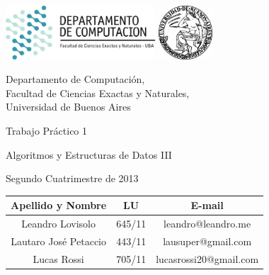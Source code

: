 \documentclass[a4paper, 10pt, twoside]{article}
\begin{document}


\thispagestyle{caratula}

\begin{center}

\includegraphics[height=2cm]{DC.png} 
\hfill
\includegraphics[height=2cm]{UBA.jpg} 

\vspace{2cm}

Departamento de Computación,\\
Facultad de Ciencias Exactas y Naturales,\\
Universidad de Buenos Aires

\vspace{4cm}

\begin{Huge}
Trabajo Práctico 1
\end{Huge}

\vspace{0.5cm}

\begin{Large}
Algoritmos y Estructuras de Datos III
\end{Large}

\vspace{1cm}

Segundo Cuatrimestre de 2013

\vspace{4cm}

\begin{tabular}{|c|c|c|}
\hline
Apellido y Nombre & LU & E-mail\\
\hline
Leandro Lovisolo      & 645/11 & leandro@leandro.me\\
Lautaro José Petaccio & 443/11 & lausuper@gmail.com\\
Lucas Rossi           & 705/11 & lucasrossi20@gmail.com\\
\hline
\end{tabular}

\end{center}
\end{document}
